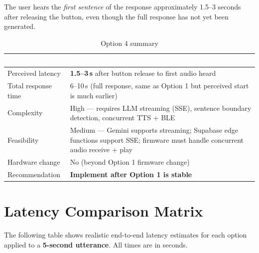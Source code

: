 \documentclass[12pt,a4paper]{article}
\begin{document}
The user hears the \emph{first sentence} of the response approximately 1.5--3 seconds after
releasing the button, even though the full response has not yet been generated.

\begin{table}[h!]
\centering
\renewcommand{\arraystretch}{1.3}
\begin{tabularx}{\linewidth}{|l|X|}
\hline
\rowcolor{primary}
\textcolor{white}{\textbf{Aspect}} & \textcolor{white}{\textbf{Detail}} \\
\hline
Perceived latency    & \textbf{1.5--3\,s} after button release to first audio heard \\
\hline
\rowcolor{rowalt}
Total response time  & 6--10\,s (full response, same as Option 1 but perceived start is much earlier) \\
\hline
Complexity           & High — requires LLM streaming (SSE), sentence boundary detection, concurrent TTS + BLE \\
\hline
\rowcolor{rowalt}
Feasibility          & Medium — Gemini supports streaming; Supabase edge functions support SSE; firmware must handle concurrent audio receive + play \\
\hline
Hardware change      & No (beyond Option 1 firmware change) \\
\hline
\rowcolor{rowalt}
Recommendation       & \textbf{Implement after Option 1 is stable} \\
\hline
\end{tabularx}
\caption{Option 4 summary}
\end{table}

\section{Latency Comparison Matrix}

The following table shows realistic end-to-end latency estimates for each option applied to a
\textbf{5-second utterance}. All times are in seconds.
\end{document}
